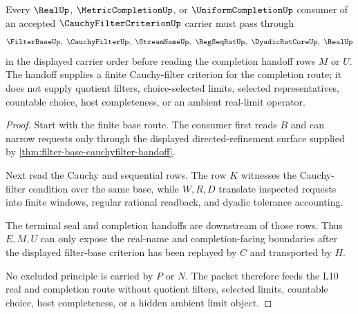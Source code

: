 \begin{theorem}
\label{thm:cauchy-filter-criterion-real-completion-handoff}
Every $\RealUp$, $\MetricCompletionUp$, or $\UniformCompletionUp$ consumer of an accepted $\CauchyFilterCriterionUp$ carrier must pass through
$$
\FilterBaseUp,\ \CauchyFilterUp,\ \StreamNameUp,\ \RegSeqRatUp,\ \DyadicRatCoreUp,\ \RealUp
$$
in the displayed carrier order before reading the completion handoff rows $M$ or $U$. The handoff supplies a finite Cauchy-filter criterion for the completion route; it does not supply quotient filters, choice-selected limits, selected representatives, countable choice, host completeness, or an ambient real-limit operator.
\end{theorem}
\begin{proof}
Start with the finite base route. The consumer first reads $B$ and can narrow requests only through the displayed directed-refinement surface supplied by \autoref{thm:filter-base-cauchyfilter-handoff}.

Next read the Cauchy and sequential rows. The row $K$ witnesses the Cauchy-filter condition over the same base, while $W,R,D$ translate inspected requests into finite windows, regular rational readback, and dyadic tolerance accounting.

The terminal seal and completion handoffs are downstream of those rows. Thus $E,M,U$ can only expose the real-name and completion-facing boundaries after the displayed filter-base criterion has been replayed by $C$ and transported by $H$.

No excluded principle is carried by $P$ or $N$. The packet therefore feeds the L10 real and completion route without quotient filters, selected limits, countable choice, host completeness, or a hidden ambient limit object.
\end{proof}


